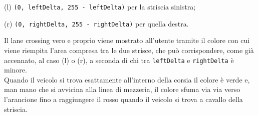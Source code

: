 \documentclass[12pt]{article}
\begin{document}
\hspace{1.5 cm}(l) \texttt{(0, leftDelta, 255 - leftDelta)} per la striscia sinistra;

\hspace{1.5 cm}(r) \texttt{(0, rightDelta, 255 - rightDelta)} per quella destra.

\hspace{0.2 cm} Il lane crossing vero e proprio viene mostrato all'utente tramite il colore con cui viene riempita l'area compresa tra le due strisce, che può corrispondere, come già accennato, al caso (l) o (r), a seconda di chi tra \texttt{leftDelta} e \texttt{rightDelta} è minore.\\
Quando il veicolo si trova esattamente all'interno della corsia il colore è verde e, man mano che si avvicina alla linea di mezzeria, il colore sfuma via via verso l'arancione fino a raggiungere il rosso quando il veicolo si trova a cavallo della striscia. \\
\end{document}
